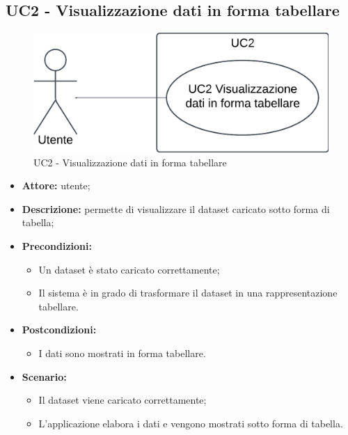 \subsection{UC2 - Visualizzazione dati in forma tabellare}
\begin{figure}[h!]
    \centering
    \includegraphics[scale=0.7]{template/images/UC2.png}
    \caption{UC2 - Visualizzazione dati in forma tabellare}
\end{figure}
\begin{itemize}
    \item \textbf{Attore:} utente;
    \item \textbf{Descrizione:} permette di visualizzare il dataset caricato sotto forma di tabella;
    \item \textbf{Precondizioni:}
    \begin{itemize}
        \item Un dataset è stato caricato correttamente;
        \item Il sistema è in grado di trasformare il dataset in una rappresentazione tabellare.
    \end{itemize}
    \item \textbf{Postcondizioni:}
    \begin{itemize}
        \item I dati sono mostrati in forma tabellare.
    \end{itemize}
    \item \textbf{Scenario:}
    \begin{itemize}
        \item Il dataset viene caricato correttamente;
        \item L'applicazione elabora i dati e vengono mostrati sotto forma di tabella.
    \end{itemize}
\end{itemize}

